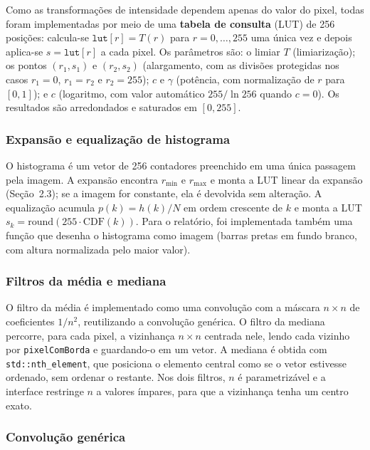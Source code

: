 \documentclass[11pt,a4paper]{article}
\begin{document}
Como as transformações de intensidade dependem apenas do valor do pixel, todas foram
implementadas por meio de uma \textbf{tabela de consulta} (LUT) de 256 posições: calcula-se
$\texttt{lut}[r] = T(r)$ para $r = 0, \dots, 255$ uma única vez e depois aplica-se
$s = \texttt{lut}[r]$ a cada pixel. Os parâmetros são: o limiar $T$ (limiarização); os pontos
$(r_1, s_1)$ e $(r_2, s_2)$ (alargamento, com as divisões protegidas nos casos $r_1 = 0$,
$r_1 = r_2$ e $r_2 = 255$); $c$ e $\gamma$ (potência, com normalização de $r$ para $[0,1]$); e
$c$ (logaritmo, com valor automático $255/\ln 256$ quando $c = 0$). Os resultados são
arredondados e saturados em $[0, 255]$.

\subsubsection{Expansão e equalização de histograma}

O histograma é um vetor de 256 contadores preenchido em uma única passagem pela imagem. A
expansão encontra $r_{\min}$ e $r_{\max}$ e monta a LUT linear da expansão (Seção~2.3); se a
imagem for constante, ela é devolvida sem alteração. A equalização acumula $p(k) = h(k)/N$ em
ordem crescente de $k$ e monta a LUT $s_k = \mathrm{round}(255 \cdot \mathrm{CDF}(k))$. Para o
relatório, foi implementada também uma função que desenha o histograma como imagem (barras
pretas em fundo branco, com altura normalizada pelo maior valor).

\subsubsection{Filtros da média e mediana}

O filtro da média é implementado como uma convolução com a máscara $n \times n$ de
coeficientes $1/n^2$, reutilizando a convolução genérica. O filtro da mediana percorre, para
cada pixel, a vizinhança $n \times n$ centrada nele, lendo cada vizinho por
\texttt{pixelComBorda} e guardando-o em um vetor. A mediana é obtida com
\texttt{std::nth\_element}, que posiciona o elemento central como se o vetor estivesse
ordenado, sem ordenar o restante. Nos dois filtros, $n$ é parametrizável e a interface
restringe $n$ a valores ímpares, para que a vizinhança tenha um centro exato.

\subsubsection{Convolução genérica}
\end{document}
